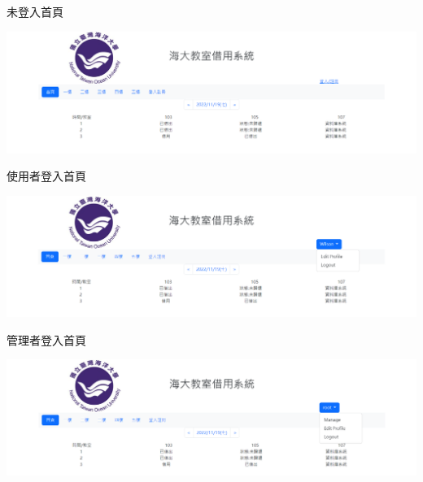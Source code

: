 \documentclass{article}
\begin{document}
\newpage


\begin{Large}
	未登入首頁
\end{Large}

\begin{center}
	\includegraphics[scale=0.35]{SDDFirstpage.png}
\end{center}

\hspace*{\fill} 

\begin{Large}
	使用者登入首頁
\end{Large}

\begin{center}
	\includegraphics[scale=0.35]{SDDUserLoginnedFirstpage.png}
\end{center}

\hspace*{\fill} 

\begin{Large}
	管理者登入首頁
\end{Large}

\begin{center}
	\includegraphics[scale=0.35]{SDDAdminLoginnedFirstpage.png}
\end{center}

\newpage
\end{document}
